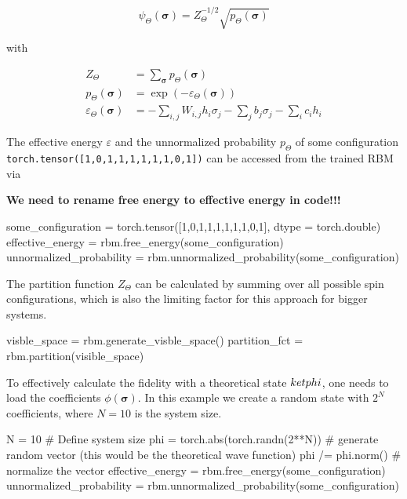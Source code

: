\documentclass[a4paper]{article}
\begin{document}
\begin{equation}
\psi_{\Theta}(\bm{\sigma}) = Z_{\Theta}^{-1/2} \sqrt{p_{\Theta} (\bm{\sigma})}
\end{equation}

with

\begin{align}
Z_{\Theta} &= \sum_{\bm{\sigma}} p_{\Theta}(\bm{\sigma}) \\
p_{\Theta} (\bm{\sigma}) &= \exp{ (- \varepsilon_{\Theta} (\bm{\sigma}))} \\
\varepsilon_{\Theta} (\bm{\sigma}) &= -\sum_{i,j} W_{i,j} h_i \sigma_j - \sum_j b_j \sigma_j - \sum_i c_i h_i
\end{align}


The effective energy $\varepsilon$ and the unnormalized probability $p_{\Theta}$ of some configuration 
\verb|torch.tensor([1,0,1,1,1,1,1,1,0,1])| can be accessed from the trained RBM via

\textbf{We need to rename free energy to effective energy in code!!!}

\begin{python}
some_configuration = torch.tensor([1,0,1,1,1,1,1,1,0,1], dtype = torch.double)
effective_energy = rbm.free_energy(some_configuration)
unnormalized_probability = rbm.unnormalized_probability(some_configuration) 
\end{python}

The partition function $Z_{\Theta}$ can be calculated by summing over all possible spin configurations, which is also the limiting factor for this approach for bigger systems.

\begin{python}
visble_space = rbm.generate_visble_space()
partition_fct = rbm.partition(visible_space)
\end{python}

To effectively calculate the fidelity with a theoretical state $\\ket{phi}$, one needs to load the coefficients $\phi(\bm{\sigma})$. In this example we create a random state with $2^N$ coefficients, where $N=10$ is the system size.

\begin{python}
N = 10 # Define system size
phi =  torch.abs(torch.randn(2**N)) # generate random vector (this would be the theoretical wave function)
phi /= phi.norm() # normalize the vector
effective_energy = rbm.free_energy(some_configuration)
unnormalized_probability = rbm.unnormalized_probability(some_configuration) 
\end{python}
\end{document}

